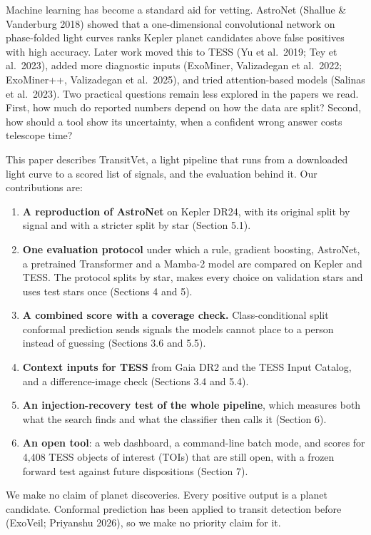\documentclass[fleqn,usenatbib]{mnras}
\providecommand{\tightlist}{\setlength{\itemsep}{0pt}\setlength{\parskip}{0pt}}
\begin{document}
Machine learning has become a standard aid for vetting. AstroNet (Shallue \& Vanderburg 2018) showed that a one-dimensional convolutional network on phase-folded light curves ranks Kepler planet candidates above false positives with high accuracy. Later work moved this to TESS (Yu et al.~2019; Tey et al.~2023), added more diagnostic inputs (ExoMiner, Valizadegan et al.~2022; ExoMiner++, Valizadegan et al.~2025), and tried attention-based models (Salinas et al.~2023). Two practical questions remain less explored in the papers we read. First, how much do reported numbers depend on how the data are split? Second, how should a tool show its uncertainty, when a confident wrong answer costs telescope time?

This paper describes TransitVet, a light pipeline that runs from a downloaded light curve to a scored list of signals, and the evaluation behind it. Our contributions are:

\begin{enumerate}
\def\labelenumi{\arabic{enumi}.}
\tightlist
\item
  \textbf{A reproduction of AstroNet} on Kepler DR24, with its original split by signal and with a stricter split by star (Section 5.1).
\item
  \textbf{One evaluation protocol} under which a rule, gradient boosting, AstroNet, a pretrained Transformer and a Mamba-2 model are compared on Kepler and TESS. The protocol splits by star, makes every choice on validation stars and uses test stars once (Sections 4 and 5).
\item
  \textbf{A combined score with a coverage check.} Class-conditional split conformal prediction sends signals the models cannot place to a person instead of guessing (Sections 3.6 and 5.5).
\item
  \textbf{Context inputs for TESS} from Gaia DR2 and the TESS Input Catalog, and a difference-image check (Sections 3.4 and 5.4).
\item
  \textbf{An injection-recovery test of the whole pipeline}, which measures both what the search finds and what the classifier then calls it (Section 6).
\item
  \textbf{An open tool}: a web dashboard, a command-line batch mode, and scores for 4,408 TESS objects of interest (TOIs) that are still open, with a frozen forward test against future dispositions (Section 7).
\end{enumerate}

We make no claim of planet discoveries. Every positive output is a planet candidate. Conformal prediction has been applied to transit detection before (ExoVeil; Priyanshu 2026), so we make no priority claim for it.
\end{document}
